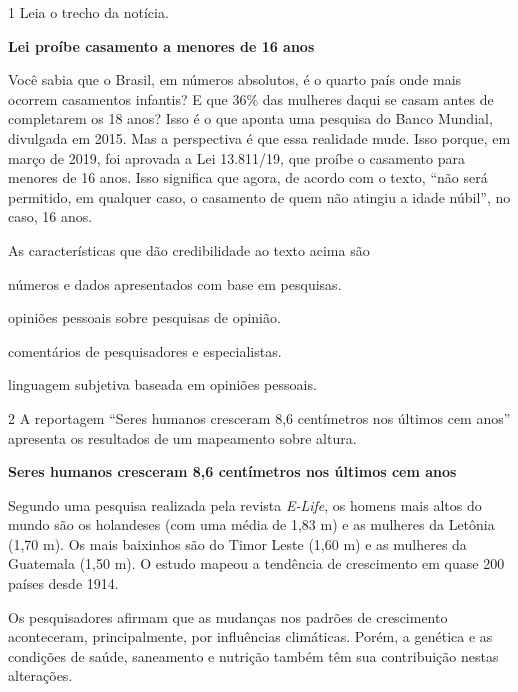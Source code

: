 
\pagebreak 

\num{1} Leia o trecho da notícia.

\begin{myquote}
\textbf{Lei proíbe casamento a menores de 16 anos}

Você sabia que o Brasil, em números absolutos, é o quarto país onde mais
ocorrem casamentos infantis? E que 36\% das mulheres daqui se casam
antes de completarem os 18 anos? Isso é o que aponta uma pesquisa do
Banco Mundial, divulgada em 2015. Mas a perspectiva é que essa realidade
mude. Isso porque, em março de 2019, foi aprovada a Lei 13.811/19, que
proíbe o casamento para menores de 16 anos. Isso significa que agora, de
acordo com o texto, ``não será permitido, em qualquer caso, o casamento
de quem não atingiu a idade núbil'', no caso, 16 anos.

\end{myquote}

As características que dão credibilidade ao texto acima são

\begin{escolha}
\item números e dados apresentados com base em pesquisas.

\item opiniões pessoais sobre pesquisas de opinião.

\item comentários de pesquisadores e especialistas.

\item linguagem subjetiva baseada em opiniões pessoais.
\end{escolha}



\num{2} A reportagem ``Seres humanos cresceram 8,6 centímetros nos últimos cem
anos'' apresenta os resultados de um mapeamento sobre altura.

\begin{myquote}
\textbf{Seres humanos cresceram 8,6 centímetros nos últimos cem anos}

Segundo uma pesquisa realizada pela revista \textit{E-Life}, os homens
mais altos do mundo são os holandeses (com uma média de 1,83 m) e as
mulheres da Letônia (1,70 m). Os mais baixinhos são do Timor Leste (1,60 m)
e as mulheres da Guatemala (1,50 m). O estudo mapeou a tendência de
crescimento em quase 200 países desde 1914.

Os pesquisadores afirmam que as mudanças nos padrões de crescimento
aconteceram, principalmente, por influências climáticas. Porém, a 
genética e as condições de saúde, saneamento e nutrição também têm sua
contribuição nestas alterações.

\end{myquote}


